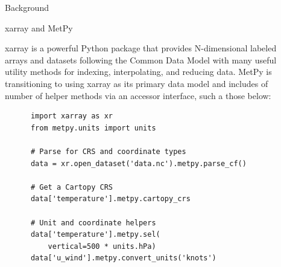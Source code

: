 \documentclass[final]{beamer}
\newlength{\sepwidth}
\newlength{\colwidth}
\newcommand{\separatorcolumn}{\begin{column}{\sepwidth}\end{column}}
\begin{document}
\begin{frame}[t, fragile]
\begin{columns}[t]
\begin{column}{\colwidth}
\begin{block}{Background}
  \end{block}

  \begin{alertblock}{xarray and MetPy}

    xarray is a powerful Python package that provides N-dimensional labeled arrays and datasets following the Common Data Model with many useful utility methods for indexing, interpolating, and reducing data. MetPy is transitioning to using xarray as its primary data model and includes of number of helper methods via an accessor interface, such a those below:

    \begin{verbatim}
      import xarray as xr
      from metpy.units import units

      # Parse for CRS and coordinate types
      data = xr.open_dataset('data.nc').metpy.parse_cf()

      # Get a Cartopy CRS
      data['temperature'].metpy.cartopy_crs

      # Unit and coordinate helpers
      data['temperature'].metpy.sel(
          vertical=500 * units.hPa)
      data['u_wind'].metpy.convert_units('knots')
    \end{verbatim}

  \end{alertblock}

\end{column}

\separatorcolumn

\begin{column}{\colwidth}

  \begin{exampleblock}

    \vspace{-2em}


\end{exampleblock}
\end{column}
\end{columns}
\end{frame}
\end{document}
